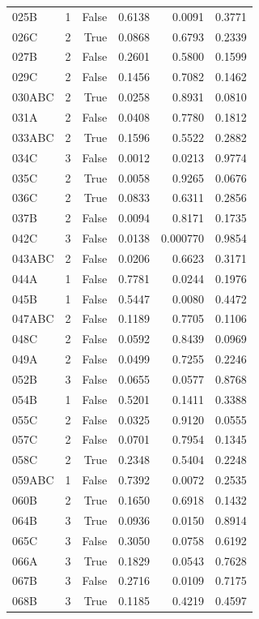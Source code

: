 \begin{longtable}{lrrrrr}
  025B & 1 & False & 0.6138 & 0.0091 & 0.3771 \\
  026C & 2 & True & 0.0868 & 0.6793 & 0.2339 \\
  027B & 2 & False & 0.2601 & 0.5800 & 0.1599 \\
  029C & 2 & False & 0.1456 & 0.7082 & 0.1462 \\
  030ABC & 2 & True & 0.0258 & 0.8931 & 0.0810 \\
  031A & 2 & False & 0.0408 & 0.7780 & 0.1812 \\
  033ABC & 2 & True & 0.1596 & 0.5522 & 0.2882 \\
  034C & 3 & False & 0.0012 & 0.0213 & 0.9774 \\
  035C & 2 & True & 0.0058 & 0.9265 & 0.0676 \\
  036C & 2 & True & 0.0833 & 0.6311 & 0.2856 \\
  037B & 2 & False & 0.0094 & 0.8171 & 0.1735 \\
  042C & 3 & False & 0.0138 & 0.000770 & 0.9854 \\
  043ABC & 2 & False & 0.0206 & 0.6623 & 0.3171 \\
  044A & 1 & False & 0.7781 & 0.0244 & 0.1976 \\
  045B & 1 & False & 0.5447 & 0.0080 & 0.4472 \\
  047ABC & 2 & False & 0.1189 & 0.7705 & 0.1106 \\
  048C & 2 & False & 0.0592 & 0.8439 & 0.0969 \\
  049A & 2 & False & 0.0499 & 0.7255 & 0.2246 \\
  052B & 3 & False & 0.0655 & 0.0577 & 0.8768 \\
  054B & 1 & False & 0.5201 & 0.1411 & 0.3388 \\
  055C & 2 & False & 0.0325 & 0.9120 & 0.0555 \\
  057C & 2 & False & 0.0701 & 0.7954 & 0.1345 \\
  058C & 2 & True & 0.2348 & 0.5404 & 0.2248 \\
  059ABC & 1 & False & 0.7392 & 0.0072 & 0.2535 \\
  060B & 2 & True & 0.1650 & 0.6918 & 0.1432 \\
  064B & 3 & True & 0.0936 & 0.0150 & 0.8914 \\
  065C & 3 & False & 0.3050 & 0.0758 & 0.6192 \\
  066A & 3 & True & 0.1829 & 0.0543 & 0.7628 \\
  067B & 3 & False & 0.2716 & 0.0109 & 0.7175 \\
  068B & 3 & True & 0.1185 & 0.4219 & 0.4597 \\

\end{longtable}
